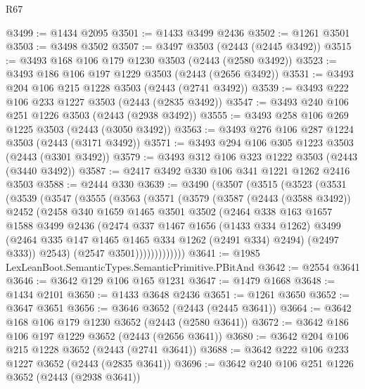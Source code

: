 \begin{lexlean}{R67}
\begin{coremodule}
@3499 := @1434 @2095
@3501 := @1433 @3499 @2436
@3502 := @1261 @3501
@3503 := @3498 @3502
@3507 := @3497 @3503 (@2443 (@2445 @3492))
@3515 := @3493 @168 @106 @179 @1230 @3503 (@2443 (@2580 @3492))
@3523 := @3493 @186 @106 @197 @1229 @3503 (@2443 (@2656 @3492))
@3531 := @3493 @204 @106 @215 @1228 @3503 (@2443 (@2741 @3492))
@3539 := @3493 @222 @106 @233 @1227 @3503 (@2443 (@2835 @3492))
@3547 := @3493 @240 @106 @251 @1226 @3503 (@2443 (@2938 @3492))
@3555 := @3493 @258 @106 @269 @1225 @3503 (@2443 (@3050 @3492))
@3563 := @3493 @276 @106 @287 @1224 @3503 (@2443 (@3171 @3492))
@3571 := @3493 @294 @106 @305 @1223 @3503 (@2443 (@3301 @3492))
@3579 := @3493 @312 @106 @323 @1222 @3503 (@2443 (@3440 @3492))
@3587 := @2417 @3492 @330 @106 @341 @1221 @1262 @2416 @3503
@3588 := @2444 @330
@3639 := @3490
    (@3507
      (@3515
        (@3523
          (@3531
            (@3539
              (@3547
                (@3555
                  (@3563
                    (@3571
                      (@3579
                        (@3587
                          (@2443 (@3588 @3492))
                          @2452
                          (@2458
                            @340
                            @1659
                            @1465
                            @3501
                            @3502
                            (@2464
                              @338
                              @163
                              @1657
                              @1588
                              @3499
                              @2436
                              (@2474
                                @337
                                @1467
                                @1656
                                (@1433 @334 @1262)
                                @3499
                                (@2464 @335 @147 @1465 @1465 @334 @1262 (@2491 @334) @2494)
                                (@2497 @333))
                              @2543)
                            (@2547 @3501)))))))))))))
@3641 := @1985 LexLeanBoot.SemanticTypes.SemanticPrimitive.PBitAnd
@3642 := @2554 @3641
@3646 := @3642 @129 @106 @165 @1231
@3647 := @1479 @1668
@3648 := @1434 @2101
@3650 := @1433 @3648 @2436
@3651 := @1261 @3650
@3652 := @3647 @3651
@3656 := @3646 @3652 (@2443 (@2445 @3641))
@3664 := @3642 @168 @106 @179 @1230 @3652 (@2443 (@2580 @3641))
@3672 := @3642 @186 @106 @197 @1229 @3652 (@2443 (@2656 @3641))
@3680 := @3642 @204 @106 @215 @1228 @3652 (@2443 (@2741 @3641))
@3688 := @3642 @222 @106 @233 @1227 @3652 (@2443 (@2835 @3641))
@3696 := @3642 @240 @106 @251 @1226 @3652 (@2443 (@2938 @3641))

\end{coremodule}
\end{lexlean}
